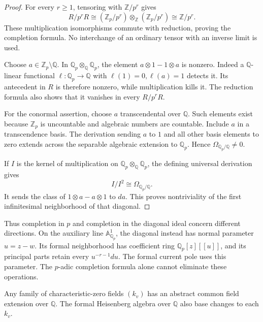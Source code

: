 \begin{proof}
For every \(r\geq1\), tensoring with
\(\mathbb Z/p^r\) gives
\[
 R/p^rR
   \cong(\mathbb Z_p/p^r)\otimes_{\mathbb Z}
                         (\mathbb Z_p/p^r)
   \cong\mathbb Z/p^r.
\]
These multiplication isomorphisms commute
with reduction, proving the completion formula.
No interchange of an ordinary tensor
with an inverse limit is used.

Choose \(a\in\mathbb Z_p\setminus\mathbb Q\).
In \(\mathbb Q_p\otimes_{\mathbb Q}\mathbb Q_p\),
the element \(a\otimes1-1\otimes a\) is nonzero.
Indeed a \(\mathbb Q\)-linear functional
\(\ell:\mathbb Q_p\to\mathbb Q\) with
\(\ell(1)=0,\ell(a)=1\) detects it.
Its antecedent in \(R\) is therefore nonzero,
while multiplication kills it.
The reduction formula also shows that
it vanishes in every \(R/p^rR\).

For the conormal assertion, choose \(a\)
transcendental over \(\mathbb Q\).
Such elements exist because \(\mathbb Z_p\)
is uncountable and algebraic numbers are countable.
Include \(a\) in a transcendence basis.
The derivation sending \(a\) to \(1\)
and all other basis elements to zero
extends across the separable algebraic extension
to \(\mathbb Q_p\).
Hence \(\Omega_{\mathbb Q_p/\mathbb Q}\ne0\).

If \(I\) is the kernel of multiplication
on \(\mathbb Q_p\otimes_{\mathbb Q}\mathbb Q_p\),
the defining universal derivation gives
\[
                         I/I^2\cong\Omega_{\mathbb Q_p/\mathbb Q}.
\]
It sends the class of \(1\otimes a-a\otimes1\)
to \(da\).
This proves nontriviality of the first
infinitesimal neighborhood of that diagonal.
\end{proof}

Thus completion in \(p\) and completion
in the diagonal ideal concern different directions.
On the auxiliary line \(\mathbb A^1_{\mathbb Q_p}\),
the diagonal instead has normal parameter
\(u=z-w\).
Its formal neighborhood has coefficient ring
\(\mathbb Q_p[z][[u]]\), and its principal
parts retain every \(u^{-r-1}du\).
The formal current pole uses this parameter.
The \(p\)-adic completion formula alone
cannot eliminate these operations.

\begin{proposition}\label{v4-prop:singular-common-coefficients}
Any family of characteristic-zero fields
\((k_v)\) has an abstract common field
extension over \(\mathbb Q\).
The formal Heisenberg algebra over
\(\mathbb Q\) also base changes to each \(k_v\).
\end{proposition}

